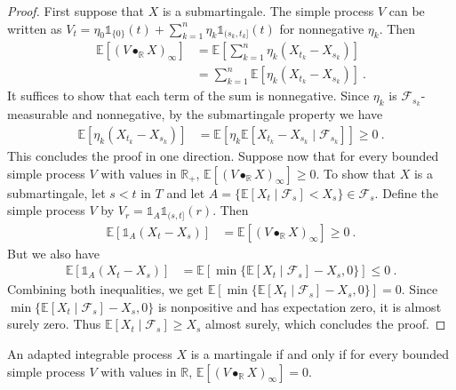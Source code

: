 \begin{proof}
First suppose that $X$ is a submartingale.
The simple process $V$ can be written as $V_t = \eta_0 \mathbb{1}_{\{0\}}(t) + \sum_{k=1}^{n} \eta_k \mathbb{1}_{(s_k, t_k]}(t)$ for nonnegative $\eta_k$. Then
\begin{align*}
  \mathbb{E}[(V \bullet_{\mathbb{R}} X)_\infty]
  &= \mathbb{E}\left[\sum_{k=1}^{n} \eta_k (X_{t_k} - X_{s_k})\right]
  \\
  &= \sum_{k=1}^{n} \mathbb{E}[\eta_k (X_{t_k} - X_{s_k})]
  \: .
\end{align*}
It suffices to show that each term of the sum is nonnegative.
Since $\eta_k$ is $\mathcal{F}_{s_k}$-measurable and nonnegative, by the submartingale property we have
\begin{align*}
  \mathbb{E}[\eta_k (X_{t_k} - X_{s_k})]
  &= \mathbb{E}[\eta_k \mathbb{E}[X_{t_k} - X_{s_k} \mid \mathcal{F}_{s_k}]]
  \ge 0
  \: .
\end{align*}
This concludes the proof in one direction.
Suppose now that for every bounded simple process $V$ with values in $\mathbb{R}_+$, $\mathbb{E}[(V \bullet_{\mathbb{R}} X)_\infty] \ge 0$.
To show that $X$ is a submartingale, let $s < t$ in $T$ and let $A = \{\mathbb{E}[X_t \mid \mathcal{F}_s] < X_s\} \in \mathcal{F}_s$.
Define the simple process $V$ by $V_r = \mathbb{1}_A \mathbb{1}_{(s, t]}(r)$.
Then
\begin{align*}
  \mathbb{E}[\mathbb{1}_A (X_t - X_s)]
  &= \mathbb{E}[(V \bullet_{\mathbb{R}} X)_\infty]
  \ge 0
  \: .
\end{align*}
But we also have
\begin{align*}
  \mathbb{E}[\mathbb{1}_A (X_t - X_s)]
  &= \mathbb{E}[\min\{\mathbb{E}[X_t \mid \mathcal{F}_s] - X_s, 0\}]
  \le 0
  \: .
\end{align*}
Combining both inequalities, we get $\mathbb{E}[\min\{\mathbb{E}[X_t \mid \mathcal{F}_s] - X_s, 0\}] = 0$.
Since $\min\{\mathbb{E}[X_t \mid \mathcal{F}_s] - X_s, 0\}$ is nonpositive and has expectation zero, it is almost surely zero.
Thus $\mathbb{E}[X_t \mid \mathcal{F}_s] \ge X_s$ almost surely, which concludes the proof.
\end{proof}


\begin{lemma}\label{lem:martingale_iff_integral_elemStochIntegral_eq_zero}
An adapted integrable process $X$ is a martingale if and only if for every bounded simple process $V$ with values in $\mathbb{R}$, $\mathbb{E}[(V \bullet_{\mathbb{R}} X)_\infty] = 0$.
\end{lemma}

